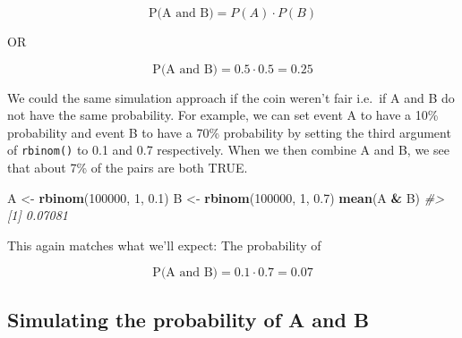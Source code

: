 \documentclass[]{article}
\newenvironment{Shaded}{\begin{snugshade}}{\end{snugshade}}
\newcommand{\CommentTok}[1]{\textcolor[rgb]{0.56,0.35,0.01}{\textit{#1}}}
\newcommand{\DecValTok}[1]{\textcolor[rgb]{0.00,0.00,0.81}{#1}}
\newcommand{\FloatTok}[1]{\textcolor[rgb]{0.00,0.00,0.81}{#1}}
\newcommand{\KeywordTok}[1]{\textcolor[rgb]{0.13,0.29,0.53}{\textbf{#1}}}
\newcommand{\NormalTok}[1]{#1}
\newcommand{\OperatorTok}[1]{\textcolor[rgb]{0.81,0.36,0.00}{\textbf{#1}}}
\newcommand{\StringTok}[1]{\textcolor[rgb]{0.31,0.60,0.02}{#1}}
\begin{document}
\[\textrm{P(A and B)} = P(A) \cdot P(B)\]

OR

\[\textrm{P(A and B)} = 0.5 \cdot 0.5 = 0.25\]

We could the same simulation approach if the coin weren't fair i.e.~if A
and B do not have the same probability. For example, we can set event A
to have a 10\% probability and event B to have a 70\% probability by
setting the third argument of \texttt{rbinom()} to 0.1 and 0.7
respectively. When we then combine A and B, we see that about 7\% of the
pairs are both TRUE.

\begin{Shaded}
\begin{Highlighting}[]
\NormalTok{A <-}\StringTok{ }\KeywordTok{rbinom}\NormalTok{(}\DecValTok{100000}\NormalTok{, }\DecValTok{1}\NormalTok{, }\FloatTok{0.1}\NormalTok{)}
\NormalTok{B <-}\StringTok{ }\KeywordTok{rbinom}\NormalTok{(}\DecValTok{100000}\NormalTok{, }\DecValTok{1}\NormalTok{, }\FloatTok{0.7}\NormalTok{)}
\KeywordTok{mean}\NormalTok{(A }\OperatorTok{&}\StringTok{ }\NormalTok{B)}
\CommentTok{#> [1] 0.07081}
\end{Highlighting}
\end{Shaded}

This again matches what we'll expect: The probability of

\[\textrm{P(A and B)} = 0.1 \cdot 0.7 = 0.07\]

\hypertarget{simulating-the-probability-of-a-and-b}{%
\subsection{Simulating the probability of A and
B}\label{simulating-the-probability-of-a-and-b}}

\begin{Shaded}
\end{Shaded}
\end{document}
